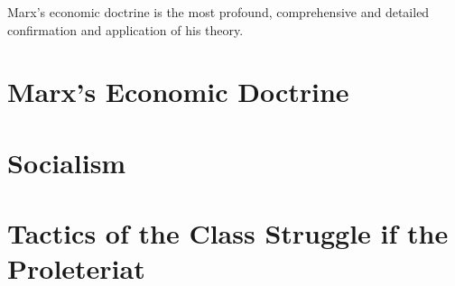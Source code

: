 \documentclass[a4paper,12pt]{book}
\begin{document}
Marx’s economic doctrine is the most profound, comprehensive and detailed confirmation and application of his theory.


\chapter{Marx's Economic Doctrine}

\chapter{Socialism}

\chapter{Tactics of the Class Struggle if the Proleteriat}

\appendix
\end{document}
